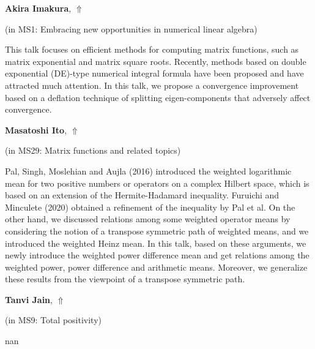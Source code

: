 \documentclass[ILAS2025-program.tex]{subfiles}
\begin{document}
\hypertarget{down0349}{}\begin{ilasabstract}
    
\textbf{Akira Imakura},  \hfill \hyperlink{up0349}{$\Uparrow$}
    
    
(in {\color{mstitle}MS1: Embracing new opportunities in numerical linear algebra})
        
\mtskip
    This talk focuses on efficient methods for computing matrix functions, such as matrix exponential and matrix square roots.
Recently, methods based on double exponential (DE)-type numerical integral formula have been proposed and have attracted much attention.
In this talk, we propose a convergence improvement based on a deflation technique of splitting eigen-components that adversely affect convergence.
\end{ilasabstract}
    

\hypertarget{down0046}{}\begin{ilasabstract}
    
\textbf{Masatoshi Ito},  \hfill \hyperlink{up0046}{$\Uparrow$}
    
    
(in {\color{mstitle}MS29: Matrix functions and related topics})
        
\mtskip
    Pal, Singh, Moslehian and Aujla (2016) introduced the weighted logarithmic mean for two positive numbers
 or operators on a complex Hilbert space, which is based on an extension of the Hermite-Hadamard inequality.
Furuichi and Minculete (2020) obtained a refinement of the inequality by Pal et al.
On the other hand, we discussed relations among some weighted operator means
 by considering the notion of a transpose symmetric path of weighted means,
 and we introduced the weighted Heinz mean.
In this talk, based on these arguments,
 we  newly introduce the weighted power difference mean and get relations
 among the weighted power, power difference and arithmetic means.
Moreover, we generalize these results from the viewpoint of a transpose symmetric path.


\end{ilasabstract}
    

\hypertarget{down0122}{}\begin{ilasabstract}
    
\textbf{Tanvi Jain},  \hfill \hyperlink{up0122}{$\Uparrow$}
    
    
(in {\color{mstitle}MS9: Total positivity})
        
\mtskip
    nan
\end{ilasabstract}
    
\end{document}
